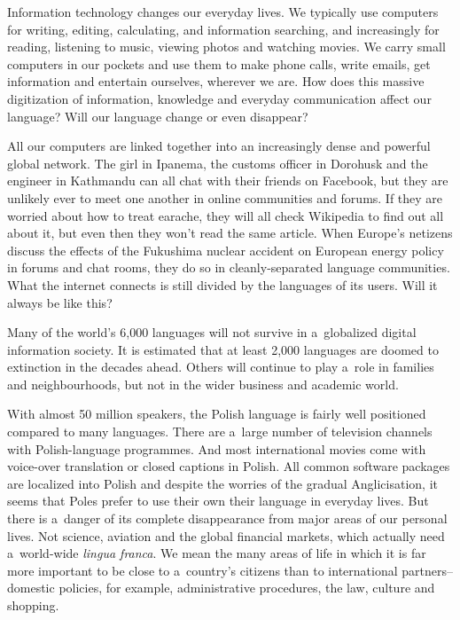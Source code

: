 \begin{multicols}{2} 

Information technology changes our everyday lives. We typically use
computers for writing, editing, calculating, and information
searching, and increasingly for reading, listening to music, viewing
photos and watching movies. We carry small computers in our pockets
and use them to make phone calls, write emails, get information and
entertain ourselves, wherever we are. How does this massive
digitization of information, knowledge and everyday communication
affect our language? Will our language change or even disappear? 

All our computers are linked together into an increasingly dense and
powerful global network. The girl in Ipanema, the customs officer in
Dorohusk and the engineer in Kathmandu can all chat with their friends
on Facebook, but they are unlikely ever to meet one another in online
communities and forums. If they are worried about how to treat
earache, they will all check Wikipedia to find out all about it, but
even then they won’t read the same article. When Europe's netizens
discuss the effects of the Fukushima nuclear accident on European
energy policy in forums and chat rooms, they do so in
cleanly-separated language communities. What the internet connects is
still divided by the languages of its users. Will it always be like
this? 

Many of the world’s 6,000 languages will not survive in a~globalized
digital information society. It is estimated that at least 2,000
languages are doomed to extinction in the decades ahead. Others will
continue to play a~role in families and neighbourhoods, but not in the
wider business and academic world. 


With almost 50 million speakers, the Polish language is fairly well
positioned compared to many languages. There are a~large number of
television channels with Polish-language programmes. And most
international movies come with voice-over translation or closed
captions in Polish. All common software packages are localized into
Polish and despite the worries of the gradual Anglicisation, it seems
that Poles prefer to use their own their language in everyday lives.
But there is a~danger of its complete disappearance from major areas
of our personal lives. Not science, aviation and the global financial
markets, which actually need a~world-wide \textit{lingua franca}. We
mean the many areas of life in which it is far more important to be
close to a~country’s citizens than to international
partners--domestic policies, for example, administrative procedures,
the law, culture and shopping. 


\end{multicols}
